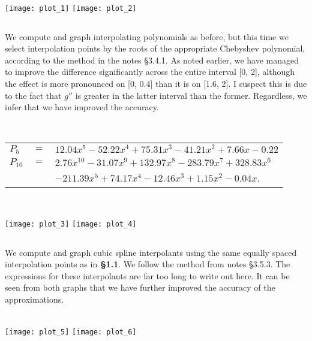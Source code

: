 \documentclass[11pt, oneside]{article}
\begin{document}
~\\

\texttt{[image: plot\_1]}
\texttt{[image: plot\_2]}

\subsection{}

We compute and graph interpolating polynomials as before, but this time we select interpolation points by the roots of the appropriate Chebyshev polynomial, according to the method in the notes \S 3.4.1. As noted earlier, we have managed to improve the difference significantly across the entire interval [0, 2], although the effect is more pronounced on [0, 0.4] than it is on [1.6, 2]. I suspect this is due to the fact that $g''$ is greater in the latter interval than the former. Regardless, we infer that we have improved the accuracy. 

~\\


\begin{tabular}{l c l}
$P_5$ & $=$ & $12.04x^5 -52.22x^4 + 75.31x^3 -41.21x^2 + 7.66x -0.22$ \\
$P_{10}$ & $=$ &
$2.76x^{10} -31.07x^9 + 132.97x^8 -283.79x^7 + 328.83x^6 
$ \\
& & $-211.39x^5 + 74.17x^4 -12.46x^3 + 1.15x^2 -0.04x$.
\end{tabular}
\\
\flushleft

\texttt{[image: plot\_3]}
\texttt{[image: plot\_4]}

\subsection{}

We compute and graph cubic spline interpolants using the same equally spaced interpolation points as in  \textbf{\S1.1}. We follow the method from notes \S3.5.3. The expressions for these interpolants are far too long to write out here. It can be seen from both graphs that we have further improved the accuracy of the approximations. 
 
 ~\\

\texttt{[image: plot\_5]}
\texttt{[image: plot\_6]}


\section{}
\end{document}
